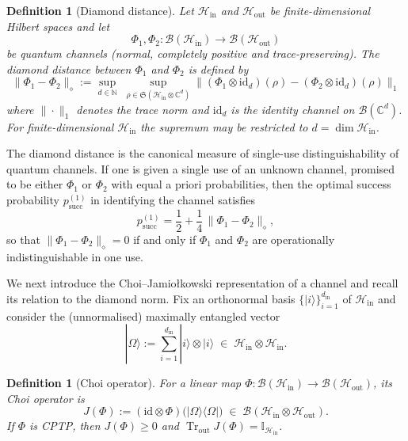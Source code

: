 \documentclass[11pt, reco]{article}
\newtheorem{definition}[theorem]{Definition}
\begin{document}
\begin{definition}[Diamond distance]
Let $\mathcal{H}_{\mathrm{in}}$ and $\mathcal{H}_{\mathrm{out}}$ be finite-dimensional Hilbert spaces and let
\[
\Phi_1,\Phi_2:\mathcal{B}(\mathcal{H}_{\mathrm{in}})\to\mathcal{B}(\mathcal{H}_{\mathrm{out}})
\]
be quantum channels (normal, completely positive and trace-preserving). The \emph{diamond distance} between $\Phi_1$ and $\Phi_2$ is defined by
\[
\|\Phi_1-\Phi_2\|_{\diamond}
:=
\sup_{d\in\mathbb{N}}
\;\sup_{\rho\in\mathfrak{S}(\mathcal{H}_{\mathrm{in}}\otimes\mathbb{C}^d)}
\big\|
(\Phi_1\otimes\mathrm{id}_d)(\rho)
-
(\Phi_2\otimes\mathrm{id}_d)(\rho)
\big\|_1
\]
where $\|\cdot\|_1$ denotes the trace norm and $\mathrm{id}_d$ is the identity channel on $\mathcal{B}(\mathbb{C}^d)$. For finite-dimensional $\mathcal{H}_{\mathrm{in}}$ the supremum may be restricted to $d=\dim\mathcal{H}_{\mathrm{in}}$.
\end{definition}

The diamond distance is the canonical measure of single-use distinguishability of quantum channels. If one is given a single use of an unknown channel, promised to be either $\Phi_1$ or $\Phi_2$ with equal a priori probabilities, then the optimal success probability $p_{\mathrm{succ}}^{(1)}$ in identifying the channel satisfies
\[
p_{\mathrm{succ}}^{(1)}
=
\frac12+\frac14\,\|\Phi_1-\Phi_2\|_{\diamond},
\]
so that $\|\Phi_1-\Phi_2\|_{\diamond}=0$ if and only if $\Phi_1$ and $\Phi_2$ are operationally indistinguishable in one use.

\medskip

We next introduce the Choi--Jamio{\l}kowski representation of a channel and recall its relation to the diamond norm. Fix an orthonormal basis $\{|i\rangle\}_{i=1}^{d_{\mathrm{in}}}$ of $\mathcal{H}_{\mathrm{in}}$ and consider the (unnormalised) maximally entangled vector
\[
|\Omega\rangle
:=
\sum_{i=1}^{d_{\mathrm{in}}}
|i\rangle\otimes|i\rangle
\;\in\;
\mathcal{H}_{\mathrm{in}}\otimes\mathcal{H}_{\mathrm{in}}.
\]

\begin{definition}[Choi operator]
For a linear map
\(
\Phi:\mathcal{B}(\mathcal{H}_{\mathrm{in}})\to\mathcal{B}(\mathcal{H}_{\mathrm{out}})
\),
its Choi operator is
\[
J(\Phi)
:=
(\mathrm{id}\otimes\Phi)\bigl(|\Omega\rangle\langle\Omega|\bigr)
\;\in\;
\mathcal{B}(\mathcal{H}_{\mathrm{in}}\otimes\mathcal{H}_{\mathrm{out}}).
\]
If $\Phi$ is CPTP, then $J(\Phi)\geq 0$ and
\(
\operatorname{Tr}_{\mathrm{out}} J(\Phi)=\mathbb{I}_{\mathcal{H}_{\mathrm{in}}}
\).

\end{definition}
\end{document}
